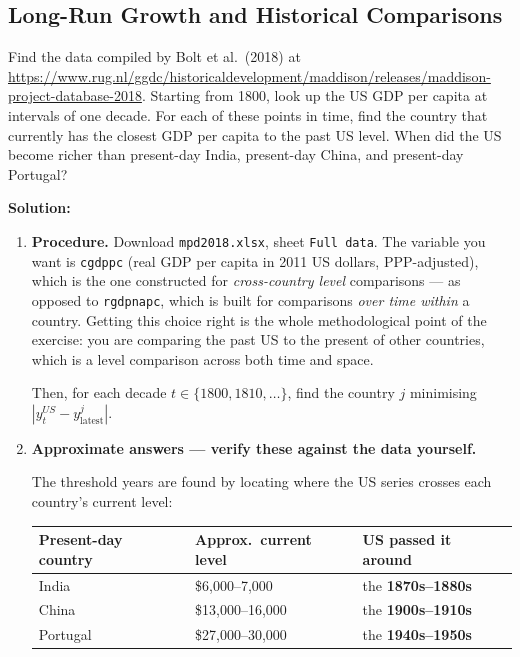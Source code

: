 \documentclass[12pt, letterpaper]{article}
\begin{document}
\subsection{Long-Run Growth and Historical Comparisons}

\begin{tcolorbox}[oddbox,title={Problem 3.1 \quad The Past is a Foreign Country}]
\begin{tcolorbox}[questionbox]
Find the data compiled by Bolt et al.\ (2018) at
\url{https://www.rug.nl/ggdc/historicaldevelopment/maddison/releases/maddison-project-database-2018}.
Starting from 1800, look up the US GDP per capita at intervals of one decade. For each of
these points in time, find the country that currently has the closest GDP per capita to the
past US level. When did the US become richer than present-day India, present-day China, and
present-day Portugal?
\end{tcolorbox}

\textbf{Solution:}

\begin{enumerate}

\item \textbf{Procedure.} Download \texttt{mpd2018.xlsx}, sheet \texttt{Full data}. The
variable you want is \texttt{cgdppc} (real GDP per capita in 2011 US dollars, PPP-adjusted),
which is the one constructed for \emph{cross-country level} comparisons --- as opposed to
\texttt{rgdpnapc}, which is built for comparisons \emph{over time within} a country. Getting
this choice right is the whole methodological point of the exercise: you are comparing the
past US to the present of other countries, which is a level comparison across both time and
space.

Then, for each decade $t \in \{1800, 1810, \ldots\}$, find the country $j$ minimising
$\left|y^{US}_t - y^{j}_{\text{latest}}\right|$.

\item \textbf{Approximate answers --- verify these against the data yourself.}

The threshold years are found by locating where the US series crosses each country's current
level:

\begin{center}
\begin{tabular}{lll}
\toprule
\textbf{Present-day country} & \textbf{Approx.\ current level} & \textbf{US passed it around} \\
\midrule
India    & \$6,000--7,000   & the \textbf{1870s--1880s} \\
China    & \$13,000--16,000 & the \textbf{1900s--1910s} \\
Portugal & \$27,000--30,000 & the \textbf{1940s--1950s} \\
\bottomrule
\end{tabular}
\end{center}


\end{enumerate}
\end{tcolorbox}
\end{document}
